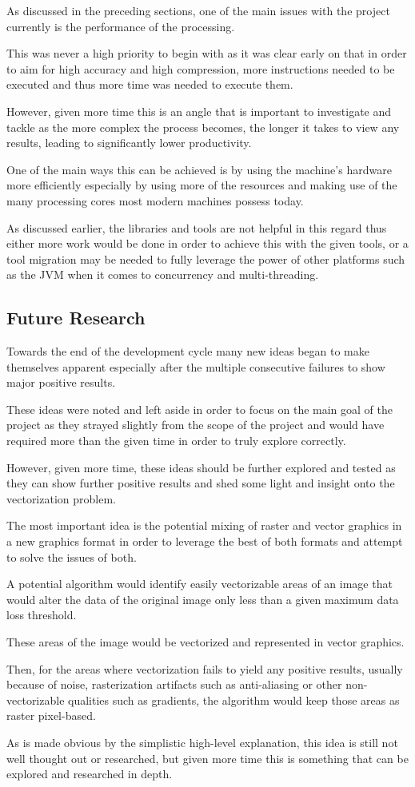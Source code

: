 \documentclass[12pt]{article}
\newcommand{\sentence}{} %
\begin{document}
    \tab
    As discussed in the preceding sections, one of the main issues with the project currently is the
    performance of the processing.
    \sentence
    This was never a high priority to begin with as it was clear early on that in order to aim for high accuracy and
    high compression, more instructions needed to be executed and thus more time was needed to execute them.
    \sentence
    However, given more time this is an angle that is important to investigate and tackle as the more complex the
    process becomes, the longer it takes to view any results, leading to significantly lower productivity.
    \sentence
    One of the main ways this can be achieved is by using the machine's hardware more efficiently especially by using
    more of the resources and making use of the many processing cores most modern machines possess today.
    \sentence
    As discussed earlier, the libraries and tools are not helpful in this regard thus either more work would be done
    in order to achieve this with the given tools, or a tool migration may be needed to fully leverage the power of
    other platforms such as the JVM when it comes to concurrency and multi-threading.

    \subsection{Future Research}\label{subsec:future-research}

    \tab
    Towards the end of the development cycle many new ideas began to make themselves apparent especially
    after the multiple consecutive failures to show major positive results.
    \sentence
    These ideas were noted and left aside in order to focus on the main goal of the project as they strayed slightly
    from the scope of the project and would have required more than the given time in order to truly explore correctly.
    \sentence
    However, given more time, these ideas should be further explored and tested as they can show further positive
    results and shed some light and insight onto the vectorization problem.
    \sentence
    The most important idea is the potential mixing of raster and vector graphics in a new graphics format in order
    to leverage the best of both formats and attempt to solve the issues of both.
    \sentence
    A potential algorithm would identify easily vectorizable areas of an image that would alter the data of the
    original image only less than a given maximum data loss threshold.
    \sentence
    These areas of the image would be vectorized and represented in vector graphics.
    \sentence
    Then, for the areas where vectorization fails to yield any positive results, usually because of noise,
    rasterization artifacts such as anti-aliasing or other non-vectorizable qualities such as gradients, the
    algorithm would keep those areas as raster pixel-based.
    \sentence
    As is made obvious by the simplistic high-level explanation, this idea is still not well thought out or
    researched, but given more time this is something that can be explored and researched in depth.
\end{document}
